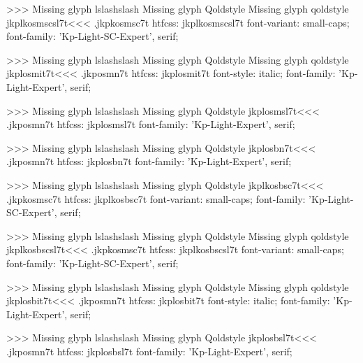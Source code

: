 >>>
Missing glyph	lslashslash
Missing glyph	Qoldstyle
Missing glyph	qoldstyle
\<jkplkosmscsl7t\><<<
.jkpkosmsc7t
htfcss:  jkplkosmscsl7t  font-variant: small-caps; font-family: 'Kp-Light-SC-Expert', serif;

>>>
Missing glyph	lslashslash
Missing glyph	Qoldstyle
Missing glyph	qoldstyle
\<jkplosmit7t\><<<
.jkposmn7t
htfcss:  jkplosmit7t  font-style: italic; font-family: 'Kp-Light-Expert', serif;

>>>
Missing glyph	lslashslash
Missing glyph	Qoldstyle
\<jkplosmsl7t\><<<
.jkposmn7t
htfcss:  jkplosmsl7t  font-family: 'Kp-Light-Expert', serif;

>>>
Missing glyph	lslashslash
Missing glyph	Qoldstyle
\<jkplosbn7t\><<<
.jkposmn7t
htfcss:  jkplosbn7t  font-family: 'Kp-Light-Expert', serif;

>>>
Missing glyph	lslashslash
Missing glyph	Qoldstyle
\<jkplkosbsc7t\><<<
.jkpkosmsc7t
htfcss:  jkplkosbsc7t  font-variant: small-caps; font-family: 'Kp-Light-SC-Expert', serif;

>>>
Missing glyph	lslashslash
Missing glyph	Qoldstyle
Missing glyph	qoldstyle
\<jkplkosbscsl7t\><<<
.jkpkosmsc7t
htfcss:  jkplkosbscsl7t  font-variant: small-caps; font-family: 'Kp-Light-SC-Expert', serif;

>>>
Missing glyph	lslashslash
Missing glyph	Qoldstyle
Missing glyph	qoldstyle
\<jkplosbit7t\><<<
.jkposmn7t
htfcss:  jkplosbit7t  font-style: italic; font-family: 'Kp-Light-Expert', serif;

>>>
Missing glyph	lslashslash
Missing glyph	Qoldstyle
\<jkplosbsl7t\><<<
.jkposmn7t
htfcss:  jkplosbsl7t  font-family: 'Kp-Light-Expert', serif;

